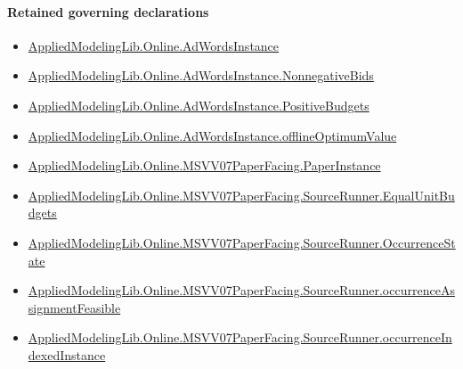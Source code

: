 \documentclass[10pt]{article}
\begin{document}
\paragraph{Retained governing declarations}
\begin{itemize}\raggedright
\item \hyperlink{governing-declaration-e5ce49672bf26ab1}{Applied\allowbreak{}Modeling\allowbreak{}Lib.\allowbreak{}Online.\allowbreak{}Ad\allowbreak{}Words\allowbreak{}Instance}
\item \hyperlink{governing-declaration-7bed8c5ff5e5cde7}{Applied\allowbreak{}Modeling\allowbreak{}Lib.\allowbreak{}Online.\allowbreak{}Ad\allowbreak{}Words\allowbreak{}Instance.\allowbreak{}Nonnegative\allowbreak{}Bids}
\item \hyperlink{governing-declaration-eabdcef9dca00922}{Applied\allowbreak{}Modeling\allowbreak{}Lib.\allowbreak{}Online.\allowbreak{}Ad\allowbreak{}Words\allowbreak{}Instance.\allowbreak{}Positive\allowbreak{}Budgets}
\item \hyperlink{governing-declaration-421b6f6fda18a867}{Applied\allowbreak{}Modeling\allowbreak{}Lib.\allowbreak{}Online.\allowbreak{}Ad\allowbreak{}Words\allowbreak{}Instance.\allowbreak{}offline\allowbreak{}Optimum\allowbreak{}Value}
\item \hyperlink{governing-declaration-11907576ec71eeb5}{Applied\allowbreak{}Modeling\allowbreak{}Lib.\allowbreak{}Online.\allowbreak{}MSVV07\allowbreak{}Paper\allowbreak{}Facing.\allowbreak{}Paper\allowbreak{}Instance}
\item \hyperlink{governing-declaration-cf74b8b54a03b174}{Applied\allowbreak{}Modeling\allowbreak{}Lib.\allowbreak{}Online.\allowbreak{}MSVV07\allowbreak{}Paper\allowbreak{}Facing.\allowbreak{}Source\allowbreak{}Runner.\allowbreak{}Equal\allowbreak{}Unit\allowbreak{}Budgets}
\item \hyperlink{governing-declaration-2eff7815f49c1d41}{Applied\allowbreak{}Modeling\allowbreak{}Lib.\allowbreak{}Online.\allowbreak{}MSVV07\allowbreak{}Paper\allowbreak{}Facing.\allowbreak{}Source\allowbreak{}Runner.\allowbreak{}Occurrence\allowbreak{}State}
\item \hyperlink{paper-prerequisite-2c878fdf44b4b3b2}{Applied\allowbreak{}Modeling\allowbreak{}Lib.\allowbreak{}Online.\allowbreak{}MSVV07\allowbreak{}Paper\allowbreak{}Facing.\allowbreak{}Source\allowbreak{}Runner.\allowbreak{}occurrence\allowbreak{}Assignment\allowbreak{}Feasible}
\item \hyperlink{governing-declaration-15d177ff0033a703}{Applied\allowbreak{}Modeling\allowbreak{}Lib.\allowbreak{}Online.\allowbreak{}MSVV07\allowbreak{}Paper\allowbreak{}Facing.\allowbreak{}Source\allowbreak{}Runner.\allowbreak{}occurrence\allowbreak{}Indexed\allowbreak{}Instance}

\end{itemize}
\end{document}
